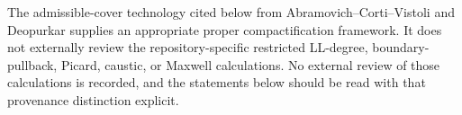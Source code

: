 \documentclass[11pt]{article}
\begin{document}
The admissible-cover technology cited below from Abramovich--Corti--Vistoli
and Deopurkar supplies an appropriate proper compactification framework.  It
does not externally review the repository-specific restricted LL-degree,
boundary-pullback, Picard, caustic, or Maxwell calculations.  No external
review of those calculations is recorded, and the statements below should be
read with that provenance distinction explicit.


\end{document}
